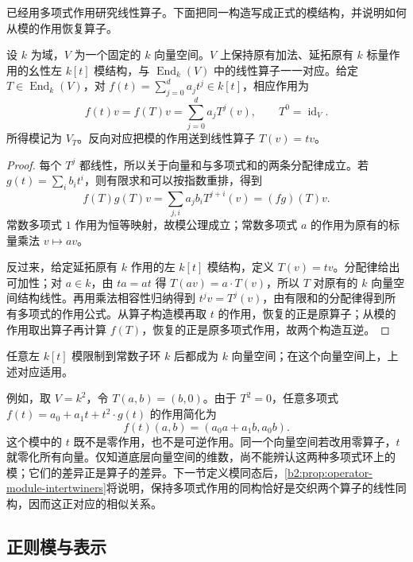 \ProseParagraphBreak
{}已经用多项式作用研究线性算子。下面把同一构造写成正式的模结构，并说明如何从模的作用恢复算子。

\begin{proposition}\label{b2:prop:operator-module}
	设 \(k\) 为域，\(V\) 为一个固定的 \(k\) 向量空间。\(V\) 上保持原有加法、延拓原有 \(k\) 标量作用的幺性左 \(k[t]\) 模结构，与 \(\operatorname{End}_k(V)\) 中的线性算子一一对应。给定 \(T\in\operatorname{End}_k(V)\)，对 \(f(t)=\sum_{j=0}^d a_jt^j\in k[t]\)，相应作用为
	\[
		f(t)v=f(T)v=\sum_{j=0}^d a_jT^j(v),\qquad T^0=\operatorname{id}_V.
	\]
	所得模记为 \(V_T\)。反向对应把模的作用送到线性算子 \(T(v)=tv\)。
\end{proposition}
\begin{proof}
	每个 \(T^j\) 都线性，所以关于向量和与多项式和的两条分配律成立。若 \(g(t)=\sum_i b_it^i\)，则有限求和可以按指数重排，得到
	\[
		f(T)g(T)v=\sum_{j,i}a_jb_iT^{j+i}(v)=(fg)(T)v.
	\]
	常数多项式 \(1\) 作用为恒等映射，故模公理成立；常数多项式 \(a\) 的作用为原有的标量乘法 \(v\mapsto av\)。

	反过来，给定延拓原有 \(k\) 作用的左 \(k[t]\) 模结构，定义 \(T(v)=tv\)。分配律给出可加性；对 \(a\in k\)，由 \(ta=at\) 得 \(T(av)=a\cdot T(v)\)，所以 \(T\) 对原有的 \(k\) 向量空间结构线性。再用乘法相容性归纳得到 \(t^jv=T^j(v)\)，由有限和的分配律得到所有多项式的作用公式。从算子构造模再取 \(t\) 的作用，恢复的正是原算子；从模的作用取出算子再计算 \(f(T)\)，恢复的正是原多项式作用，故两个构造互逆。
\end{proof}

任意左 \(k[t]\) 模限制到常数子环 \(k\) 后都成为 \(k\) 向量空间；在这个向量空间上，上述对应适用。

\ProseParagraphBreak
例如，取 \(V=k^2\)，令 \(T(a,b)=(b,0)\)。由于 \(T^2=0\)，任意多项式 \(f(t)=a_0+a_1t+t^2\cdot g(t)\) 的作用简化为
\[
	f(t)(a,b)=(a_0a+a_1b,a_0b).
\]
这个模中的 \(t\) 既不是零作用，也不是可逆作用。同一个向量空间若改用零算子，\(t\) 就零化所有向量。仅知道底层向量空间的维数，尚不能辨认这两种多项式环上的模；它们的差异正是算子的差异。下一节定义模同态后，\cref{b2:prop:operator-module-intertwiners}将说明，保持多项式作用的同构恰好是交织两个算子的线性同构，因而这正对应的相似关系。

\subsection{正则模与表示}
\label{b2:subsec:0201:03}

